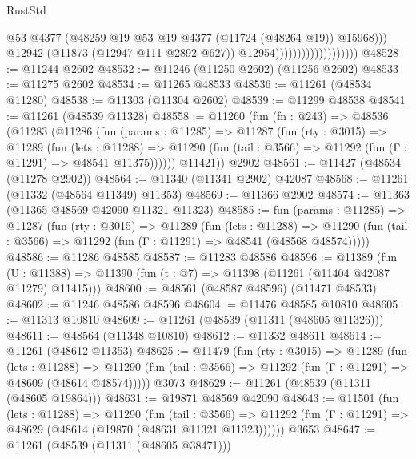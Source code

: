 \begin{lexlean}{RustStd}
\begin{coremodule}
                                              @53
                                              @4377
                                              (@48259
                                                @19
                                                @53
                                                @19
                                                @4377
                                                (@11724 (@48264 @19))
                                                @15968)))
                                          @12942
                                          (@11873 (@12947 @111 @2892 @627))
                                          @12954)))))))))))))))))))
@48528 := @11244 @2602
@48532 := @11246 (@11250 @2602) (@11256 @2602)
@48533 := @11275 @2602
@48534 := @11265 @48533
@48536 := @11261 (@48534 @11280)
@48538 := @11303 (@11304 @2602)
@48539 := @11299 @48538
@48541 := @11261 (@48539 @11328)
@48558 := @11260
    (fun (fn : @243) =>
    @48536
      (@11283
        (@11286
          (fun (params : @11285) =>
          @11287
            (fun (rty : @3015) =>
            @11289
              (fun (lets : @11288) =>
              @11290 (fun (tail : @3566) => @11292 (fun (Γ : @11291) => @48541 @11375))))))
        @11421))
    @2902
@48561 := @11427 (@48534 (@11278 @2902))
@48564 := @11340 (@11341 @2902) @42087
@48568 := @11261 (@11332 (@48564 @11349) @11353)
@48569 := @11366 @2902
@48574 := @11363 (@11365 @48569 @42090 @11321 @11323)
@48585 := fun (params : @11285) =>
  @11287
    (fun (rty : @3015) =>
    @11289
      (fun (lets : @11288) =>
      @11290 (fun (tail : @3566) => @11292 (fun (Γ : @11291) => @48541 (@48568 @48574)))))
@48586 := @11286 @48585
@48587 := @11283 @48586
@48596 := @11389
    (fun (U : @11388) => @11390 (fun (t : @7) => @11398 (@11261 (@11404 @42087 @11279) @11415)))
@48600 := @48561 (@48587 @48596) (@11471 @48533)
@48602 := @11246 @48586 @48596
@48604 := @11476 @48585 @10810
@48605 := @11313 @10810
@48609 := @11261 (@48539 (@11311 (@48605 @11326)))
@48611 := @48564 (@11348 @10810)
@48612 := @11332 @48611
@48614 := @11261 (@48612 @11353)
@48625 := @11479
    (fun (rty : @3015) =>
    @11289
      (fun (lets : @11288) =>
      @11290 (fun (tail : @3566) => @11292 (fun (Γ : @11291) => @48609 (@48614 @48574)))))
    @3073
@48629 := @11261 (@48539 (@11311 (@48605 @19864)))
@48631 := @19871 @48569 @42090
@48643 := @11501
    (fun (lets : @11288) =>
    @11290
      (fun (tail : @3566) =>
      @11292 (fun (Γ : @11291) => @48629 (@48614 (@19870 (@48631 @11321 @11323))))))
    @3653
@48647 := @11261 (@48539 (@11311 (@48605 @38471)))

\end{coremodule}
\end{lexlean}
